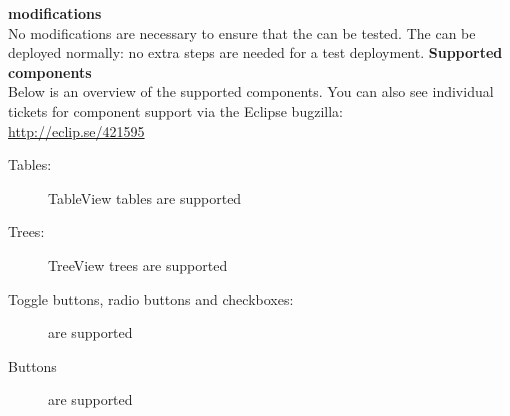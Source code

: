 \textbf{\gdaut{} modifications}\\
No modifications are necessary to ensure that the \gdaut{} can be tested. The \gdaut{} can be deployed normally: no extra steps are needed for a test deployment.
\textbf{Supported components}\\
Below is an overview of the supported components. You can also see individual tickets for component support via the Eclipse bugzilla:\\
\url{http://eclip.se/421595}
\begin{description}
\item [Tables:]{TableView tables are supported}
\item [Trees:]{TreeView trees are supported}
\item [Toggle buttons, radio buttons and checkboxes:]{are supported}
\item [Buttons]{are supported}
\end{description}
